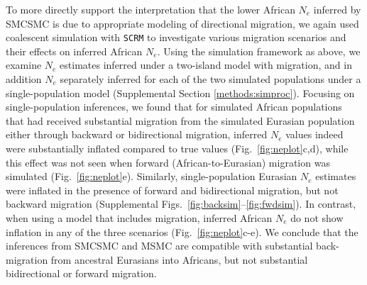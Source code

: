 \begin{figure}
	\label{fig:neplot}
\end{figure}

To more directly support the interpretation that the lower African $N_e$ inferred by SMCSMC is due to appropriate modeling of directional migration, we again used coalescent simulation with {\tt SCRM} to investigate various migration scenarios and their effects on inferred African $N_e$. Using the simulation framework as above, we examine $N_e$ estimates inferred under a two-island model with migration, and in addition $N_e$ separately inferred for each of the two simulated populations under a single-population model (Supplemental Section \ref{methods:simproc}).  Focusing on single-population inferences, we found that for simulated African populations that had received substantial migration from the simulated Eurasian population either through backward or bidirectional migration, inferred $N_e$ values indeed were substantially inflated compared to true values (Fig.\ \autoref{fig:neplot}c,d), while this effect was not seen when forward (African-to-Eurasian) migration was simulated (Fig.\ \autoref{fig:neplot}e).  
Similarly, single-population Eurasian $N_e$ estimates were inflated in the presence of forward and bidirectional migration, but not backward migration (Supplemental Figs.\ \ref{fig:backsim}--\ref{fig:fwdsim}).
In contrast, when using a model that includes migration, inferred African $N_e$ do not show inflation in any of the three scenarios (Fig.\ \autoref{fig:neplot}c-e). We conclude that the inferences from SMCSMC and MSMC are compatible with substantial back-migration from ancestral Eurasians into Africans, but not substantial bidirectional or forward migration.

